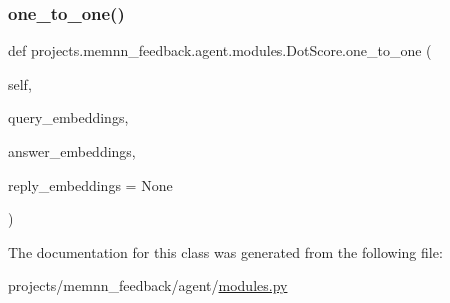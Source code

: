 \subsubsection{\texorpdfstring{one\+\_\+to\+\_\+one()}{one\_to\_one()}}
{\footnotesize\ttfamily def projects.\+memnn\+\_\+feedback.\+agent.\+modules.\+Dot\+Score.\+one\+\_\+to\+\_\+one (\begin{DoxyParamCaption}\item[{}]{self,  }\item[{}]{query\+\_\+embeddings,  }\item[{}]{answer\+\_\+embeddings,  }\item[{}]{reply\+\_\+embeddings = {\ttfamily None} }\end{DoxyParamCaption})}



The documentation for this class was generated from the following file\+:\begin{DoxyCompactItemize}
\item 
projects/memnn\+\_\+feedback/agent/\hyperlink{projects_2memnn__feedback_2agent_2modules_8py}{modules.\+py}\end{DoxyCompactItemize}

